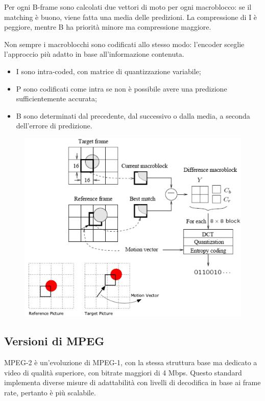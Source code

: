 Per ogni B-frame sono calcolati due vettori di moto per ogni macroblocco: se il matching è buono, viene fatta una media delle predizioni. La compressione di I è peggiore, mentre B ha priorità minore ma compressione maggiore.

Non sempre i macroblocchi sono codificati allo stesso modo: l'encoder sceglie l'approccio più adatto in base all'informazione contenuta.
\begin{itemize}
	\item I sono intra-coded, con matrice di quantizzazione variabile;
	\item P sono codificati come intra se non è possibile avere una predizione sufficientemente accurata;
	\item B sono determinati dal precedente, dal successivo o dalla media, a seconda dell'errore di predizione.
\end{itemize}

\begin{figure}[h]
	\centering
	\includegraphics[scale=0.7]{Lezioni/Immagini/p-frame}
\end{figure}

\subsection{Versioni di MPEG}
MPEG-2 è un'evoluzione di MPEG-1, con la stessa struttura base ma dedicato a video di qualità superiore, con bitrate maggiori di 4 Mbps. Questo standard implementa diverse misure di adattabilità con livelli di decodifica in base ai frame rate, pertanto è più scalabile.

